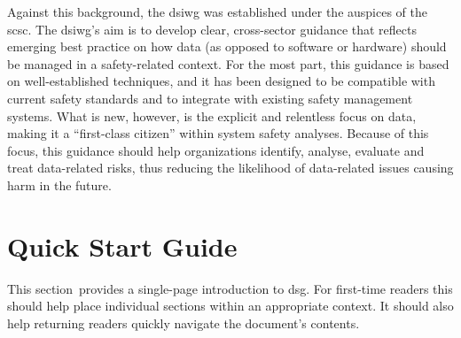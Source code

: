 Against this background, the \gls{dsiwg} was established under the auspices of the \gls{scsc}. The \gls{dsiwg}'s aim is to develop clear, cross-sector guidance that reflects emerging best practice on how data (as opposed to software or hardware) should be managed in a safety-related context.
For the most part, this guidance is based on well-established techniques,
and it has been designed to be compatible with current safety standards and to integrate with existing safety management systems.
What is new, however, is the explicit and relentless focus on data, making it a ``first-class citizen'' within system safety analyses.
\cbstart Because of this focus\cbend, this guidance should help organizations identify, analyse, evaluate and treat data-related risks, thus reducing the likelihood of data-related issues causing harm in the future.

\clearpage
\section*{Quick Start Guide}
\pagestyle{ContinuationPageFrontMatter}


\cbstart This section\cbend\ provides a single-page introduction to \gls{dsg}. For first-time readers this should help place individual sections within an appropriate context. It should also help returning readers quickly navigate the document's contents.


